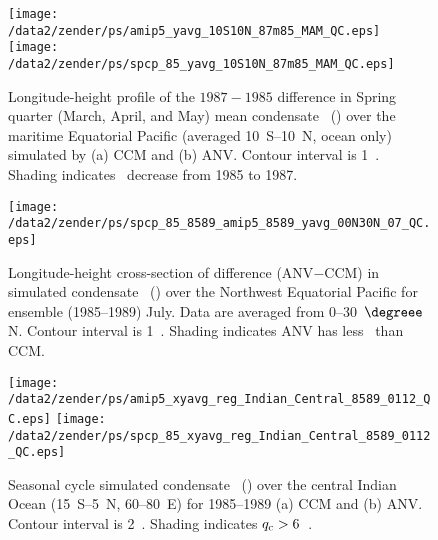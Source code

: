 \documentclass[twocolumn,final]{article}
\begin{document}
\begin{figure}
\begin{center}
\texttt{[image: /data2/zender/ps/amip5\_yavg\_10S10N\_87m85\_MAM\_QC.eps]}\vfill
\texttt{[image: /data2/zender/ps/spcp\_85\_yavg\_10S10N\_87m85\_MAM\_QC.eps]}\vfill
\end{center}
\caption[Longitude-height profile of the $1987-1985$ difference in
Spring quarter (March, April, and May) mean condensate \qc\ over the
maritime Equatorial Pacific simulated by CCM and ANV]{
Longitude-height profile of the $1987-1985$ difference in Spring quarter
(March, April, and May) mean condensate \qc\ (\mgxkg) over the
maritime Equatorial Pacific (averaged 10~\degreee S--10~\degreee N, 
ocean only) simulated by (a) CCM and (b) ANV.
Contour interval is 1~\mgxkg.
Shading indicates \qc\ decrease from 1985 to 1987.
\label{fig:yavg_10S10N_87m85_MAM_QC}}   
\end{figure}
\clearpage

\begin{figure}
\begin{center}
\texttt{[image: /data2/zender/ps/spcp\_85\_8589\_amip5\_8589\_yavg\_00N30N\_07\_QC.eps]}%
\end{center}
\caption[Longitude-height cross-section of difference (ANV$-$CCM) in
simulated condensate \qc\ over the Northwest Equatorial Pacific
for ensemble (1985--1989) July]{
Longitude-height cross-section of difference (ANV$-$CCM) in
simulated condensate \qc\ (\mgxkg) over the Northwest Equatorial Pacific
for ensemble (1985--1989) July. 
Data are averaged from 0--30~$\degreee$N.
Contour interval is 1~\mgxkg.
Shading indicates ANV has less \qc\ than CCM.
\label{fig:spcp_85_8589_amip5_8589_yavg_00N30N_07_QC}}   
\end{figure}
\clearpage

\begin{figure}
\begin{center}
\texttt{[image: /data2/zender/ps/amip5\_xyavg\_reg\_Indian\_Central\_8589\_0112\_QC.eps]}\vfill
\texttt{[image: /data2/zender/ps/spcp\_85\_xyavg\_reg\_Indian\_Central\_8589\_0112\_QC.eps]}\vfill
\end{center}
\caption[Seasonal cycle of simulated condensate \qc\ over the central
Indian Ocean for 1985--1989]{
Seasonal cycle simulated condensate \qc\ (\mgxkg) over the central
Indian Ocean (15~\degreee S--5~\degreee N, 60--80~\degreee E) for
1985--1989 (a) CCM and (b) ANV.  
Contour interval is 2~\mgxkg.
Shading indicates $\mbox{$q_\mathrm{c}$} > 6$~\mgxkg.
\label{fig:reg_xyavg_Indian_Central_0112_QC}}   
\end{figure}
\end{document}
